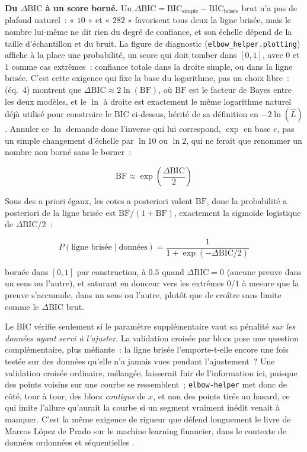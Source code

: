 \documentclass[11pt]{article}
\newcommand{\code}[1]{\texttt{#1}}
\begin{document}
\textbf{Du $\Delta\mathrm{BIC}$ à un score borné.} Un $\Delta\mathrm{BIC} =
\mathrm{BIC}_{\text{simple}} - \mathrm{BIC}_{\text{bris\'ee}}$ brut n'a pas
de plafond naturel~: « $10$ » et « $282$ » favorisent tous deux la ligne
bris\'ee, mais le nombre lui-m\^eme ne dit rien du degr\'e de confiance, et
son \'echelle d\'epend de la taille d'\'echantillon et du bruit. La figure
de diagnostic (\code{elbow\_helper.plotting}) affiche \`a la place une
probabilit\'e, un score qui doit tomber dans $[0, 1]$, avec $0$ et $1$
comme cas extr\^emes~: confiance totale dans la droite simple, ou dans la
ligne bris\'ee. C'est cette exigence qui fixe la base du logarithme, pas un
choix libre~: \citet{kassraftery1995} (\'eq.~4) montrent que
$\Delta\mathrm{BIC} \approx 2 \ln(\mathrm{BF})$, o\`u $\mathrm{BF}$ est le
facteur de Bayes entre les deux mod\`eles, et le $\ln$ \`a droite est
exactement le m\^eme logarithme naturel d\'ej\`a utilis\'e pour construire
le $\mathrm{BIC}$ ci-dessus, h\'erit\'e de sa d\'efinition en
$-2\ln(\hat L)$. Annuler ce $\ln$ demande donc l'inverse qui lui
correspond, $\exp$ en base $e$, pas un simple changement d'\'echelle par
$\ln 10$ ou $\ln 2$, qui ne ferait que renommer un nombre non born\'e sans
le borner~:

\begin{equation}
\mathrm{BF} \approx \exp\!\left(\frac{\Delta\mathrm{BIC}}{2}\right)
\end{equation}

Sous des a priori \'egaux, les cotes a posteriori valent $\mathrm{BF}$,
donc la probabilit\'e a posteriori de la ligne bris\'ee est
$\mathrm{BF} / (1 + \mathrm{BF})$, exactement la sigmo\"ide logistique de
$\Delta\mathrm{BIC} / 2$~:

\begin{equation}
P(\text{ligne bris\'ee} \mid \text{donn\'ees}) = \frac{1}{1 + \exp(-\Delta\mathrm{BIC}/2)}
\end{equation}

born\'ee dans $[0, 1]$ par construction, \`a $0.5$ quand
$\Delta\mathrm{BIC} = 0$ (aucune preuve dans un sens ou l'autre), et
saturant en douceur vers les extr\^emes $0$/$1$ \`a mesure que la preuve
s'accumule, dans un sens ou l'autre, plut\^ot que de croître sans limite
comme le $\Delta\mathrm{BIC}$ brut.

Le BIC vérifie seulement si le paramètre supplémentaire vaut sa pénalité
\emph{sur les données ayant servi à l'ajuster}. La validation croisée par
blocs pose une question complémentaire, plus méfiante~: la ligne brisée
l'emporte-t-elle encore une fois testée sur des données qu'elle n'a jamais
vues pendant l'ajustement~? Une validation croisée ordinaire, mélangée,
laisserait fuir de l'information ici, puisque des points voisins sur une
courbe se ressemblent~; \code{elbow-helper} met donc de côté, tour à tour,
des blocs \emph{contigus} de $x$, et non des points tirés au hasard, ce qui
imite l'allure qu'aurait la courbe si un segment vraiment inédit venait à
manquer. C'est la même exigence de rigueur que défend longuement le livre
de Marcos L\'opez de Prado sur le machine learning financier, dans le
contexte de données ordonnées et séquentielles
\citeyearpar{lopezdeprado2018financial}.
\end{document}

